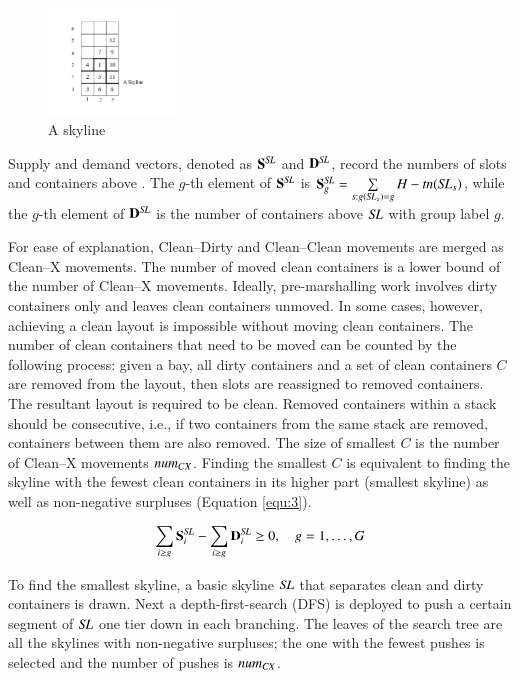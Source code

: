 \documentclass[review,3p,times,authoryear,12pt]{elsarticle}
\begin{document}
\begin{figure}[htbp]
\centering
\includegraphics[width=0.3\textwidth]{fig5.pdf}
\caption{A skyline}
\label{fig5}
\end{figure}

Supply and demand vectors, denoted as $\mathbf S^\id{SL}$ and $\mathbf D^\id{SL}$, record the numbers of slots and containers above . The $g$-th element of $\mathbf S^\id{SL}$ is $\mathbf S^\id{SL}_g=\sum\limits_{s:g(\id{SL}_s)=g}H-\id{tn}(\id{SL}_s)$, while the $g$-th element of $\mathbf D^\id{SL}$ is the number of containers above $\id{SL}$ with group label $g$.

For ease of explanation, Clean--Dirty and Clean--Clean movements are merged as Clean--X movements. The number of moved clean containers is a lower bound of the number of Clean--X movements. Ideally, pre-marshalling work involves dirty containers only and leaves clean containers unmoved. In some cases, however, achieving a clean layout is impossible without moving clean containers. The number of clean containers that need to be moved can be counted by the following process: given a bay, all dirty containers and a set of clean containers $C$ are removed from the layout, then slots are reassigned to removed containers. The resultant layout is required to be clean. Removed containers within a stack should be consecutive, i.e., if two containers from the same stack are removed, containers between them are also removed. The size of smallest $C$ is the number of Clean--X movements $\id{num}_{CX}$. Finding the smallest $C$ is equivalent to finding the skyline with the fewest clean containers in its higher part (smallest skyline) as well as non-negative surpluses (Equation \ref{equ:3}).

\begin{equation}
\label{equ:3}
\sum\limits_{i\ge g}\mathbf S^\id{SL}_i-\sum\limits_{i\ge g}\mathbf D^\id{SL}_i\ge0, \quad g=1,\dots,G
\end{equation}

To find the smallest skyline, a basic skyline $\id{SL}$ that separates clean and dirty containers is drawn. Next a depth-first-search (DFS) is deployed to push a certain segment of $\id{SL}$ one tier down in each branching. The leaves of the search tree are all the skylines with non-negative surpluses; the one with the fewest pushes is selected and the number of pushes is $\id{num}_\id{CX}$.
\end{document}
